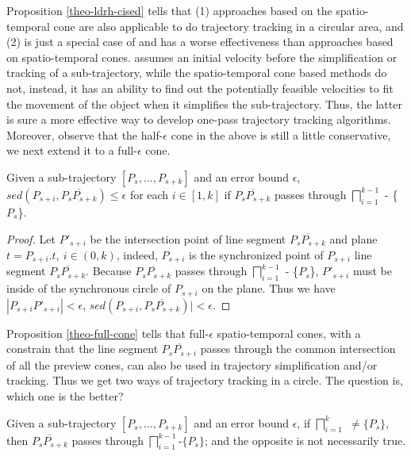 Proposition \ref{theo-ldrh-cised} tells that (1) {approaches based on the spatio-temporal cone are also applicable to do trajectory tracking in a circular area}, and (2) \ldrh is just a special case of and has a worse effectiveness than approaches based on spatio-temporal cones. \ldrh assumes an initial velocity before the simplification or tracking of a sub-trajectory, while the spatio-temporal cone based methods do not, instead, it has an ability to find out the potentially feasible velocities to fit the movement of the object when it simplifies the sub-trajectory. Thus, the latter is sure a more effective way to develop one-pass trajectory tracking algorithms. 
%
Moreover, observe that the half-$\epsilon$ cone in the above is still a little conservative, we next extend it to a full-$\epsilon$ cone.%


\begin{proposition}
	\label{theo-full-cone}
	Given a sub-trajectory $[P_s,...,P_{s+k}]$ and an error bound $\epsilon$, $sed(P_{s+i}, \overline{P_sP_{s+k}})\le \epsilon$ for each $i \in [1,k]$ if $\overline{P_sP_{s+k}}$ passes through $\bigsqcap_{i=1}^{k-1}$ - \{$P_s$\}.
\end{proposition}

\begin{proof}
Let $P'_{s+i}$ be the intersection point of line segment $\overline{P_sP_{s+k}}$ and plane $t = P_{s+i}.t,~i\in (0,k)$, indeed, $P_{s+i}$ is the synchronized point of $P_{s+i}$ \wrt line segment $\overline{P_sP_{s+k}}$. 
Because $\overline{P_sP_{s+k}}$ passes through $\bigsqcap_{i=1}^{k-1}$ - \{$P_s$\}, $P'_{s+i}$ must be inside of the synchronous circle of $P_{s+i}$ on the plane. Thus we have $|P_{s+i}P'_{s+i}|<\epsilon$, \ie $sed(P_{s+i}, \overline{P_sP_{s+k}})|<\epsilon$.
\end{proof}

Proposition \ref{theo-full-cone} tells that full-$\epsilon$ spatio-temporal cones, with a constrain that the line segment $\overline{P_sP_{s+i}}$ passes through the common intersection of all the preview cones, can also be used in trajectory simplification and/or tracking. Thus we get two ways of trajectory tracking in a circle. The question is, which one is the better?

\begin{proposition}
	\label{theo-cone-vs}
	Given a sub-trajectory $[P_s,...,P_{s+k}]$ and an error bound $\epsilon$, if $\bigsqcap_{i=1}^{k}$ $\ne \{P_s\}$, then $\overline{P_sP_{s+k}}$ passes through $\bigsqcap_{i=1}^{k-1}$-$\{P_s\}$; and the opposite is not necessarily true.
\end{proposition}

